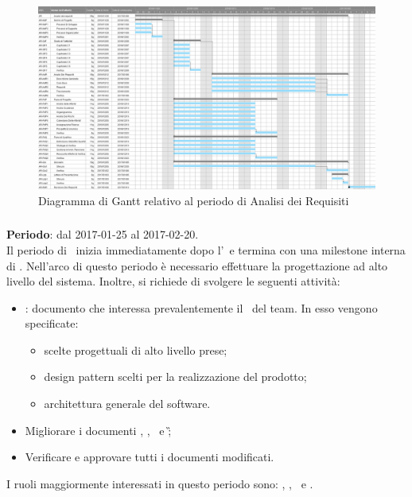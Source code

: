 		\begin{figure}[ht]
			\centering
			\includegraphics[angle=90,scale=0.37]{img/ganttnetbreak1.png}
			\caption{Diagramma di Gantt relativo al periodo di Analisi dei Requisiti}
		\end{figure}
		\FloatBarrier
		
		\subsubsection{\PA}
		\textbf{Periodo}: dal 2017-01-25 al 2017-02-20.\\
		Il periodo di \PA\ inizia immediatamente dopo l'\AR\ e termina con una milestone interna di \RPMin. Nell'arco di questo periodo è necessario effettuare la progettazione ad alto livello del sistema. Inoltre, si richiede di svolgere le seguenti attività:
		\begin{itemize}
			\item \textit{\ST}: documento che interessa prevalentemente il \Prog\ del team. In esso vengono specificate:
			\begin{itemize}
				\item scelte progettuali di alto livello prese;
				\item design pattern scelti per la realizzazione del prodotto;
				\item architettura generale del software.
			\end{itemize}
			\item Migliorare i documenti \NdP, \PdP, \PdQ\ e \G;
			\item Verificare e approvare tutti i documenti modificati.
		\end{itemize}
		I ruoli maggiormente interessati in questo periodo sono: \Amm, \Res, \Prog\ e \Ver.
		
